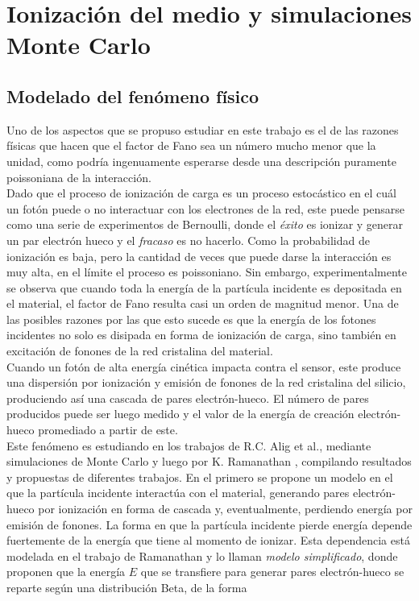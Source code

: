\chapter{Ionización del medio y simulaciones Monte Carlo}
\section{Modelado del fenómeno físico}
\noindent Uno de los aspectos que se propuso estudiar en este trabajo es el de las razones físicas que hacen que el factor de Fano sea un número mucho menor que la unidad, como podría ingenuamente esperarse desde una descripción puramente poissoniana de la interacción.\\
\indent Dado que el proceso de ionización de carga es un proceso estocástico en el cuál un fotón puede o no interactuar con los electrones de la red, este puede pensarse como una serie de experimentos de Bernoulli, donde el \textit{éxito} es ionizar y generar un par electrón hueco y el \textit{fracaso} es no hacerlo. Como la probabilidad de ionización es baja, pero la cantidad de veces que puede darse la interacción es muy alta, en el límite el proceso es poissoniano. Sin embargo, experimentalmente se observa que cuando toda la energía de la partícula incidente es depositada en el material, el factor de Fano resulta casi un orden de magnitud menor\cite{TesisKevin}. Una de las posibles razones por las que esto sucede es que la energía de los fotones incidentes no solo es disipada en forma de ionización de carga, sino también en excitación de fonones de la red cristalina del material.\\
\indent Cuando un fotón de alta energía cinética impacta contra el sensor, este produce una dispersión por ionización y emisión de fonones de la red cristalina del silicio, produciendo así una cascada de pares electrón-hueco. El número de pares producidos puede ser luego medido y el valor de la energía de creación electrón-hueco promediado a partir de este.\\
\indent Este fenómeno es estudiando en los trabajos de R.C. Alig et al.\cite{Alig}, mediante simulaciones de Monte Carlo y luego por K. Ramanathan \cite{Ramanathan}, compilando resultados y propuestas de diferentes trabajos. En el primero se propone un modelo en el que la partícula incidente interactúa con el material, generando pares electrón-hueco por ionización en forma de cascada y, eventualmente, perdiendo energía por emisión de fonones. La forma en que la partícula incidente pierde energía depende fuertemente de la energía que tiene al momento de ionizar. Esta dependencia está modelada en el trabajo de Ramanathan\cite{Ramanathan} y lo llaman \textit{modelo simplificado}, donde proponen que la energía $E$ que se transfiere para generar pares electrón-hueco se reparte según una distribución Beta, de la forma
